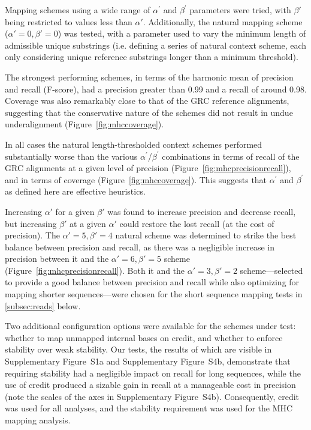 Mapping schemes using a wide range of $\alpha^\prime$ and $\beta^\prime$ parameters were tried, with $\beta'$ being restricted to values less than $\alpha'$. Additionally, the natural mapping scheme ($\alpha' = 0, \beta' = 0$) was tested, with a parameter used to vary the minimum length of admissible unique substrings (i.e. defining a series of natural context scheme, each only considering unique reference substrings longer than a minimum threshold). 

The strongest performing schemes, in terms of the harmonic mean of precision and recall (F-score), had a precision greater than 0.99 and a recall of around 0.98. Coverage was also remarkably close to that of the GRC reference alignments, suggesting that the conservative nature of the schemes did not result in undue underalignment (Figure~\ref{fig:mhccoverage}). 

In all cases the natural length-thresholded context schemes performed substantially worse than the various $\alpha^\prime$/$\beta^\prime$ combinations in terms of recall of the GRC alignments at a given level of precision (Figure~\ref{fig:mhcprecisionrecall}), and in terms of coverage (Figure~\ref{fig:mhccoverage}). This suggests that $\alpha^\prime$ and $\beta^\prime$ as defined here are effective heuristics. 

Increasing $\alpha'$ for a given $\beta'$ was found to increase precision and decrease recall, but increasing $\beta'$ at a given $\alpha'$ could restore the lost recall (at the cost of precision). The $\alpha' = 5, \beta' = 4$ natural scheme was determined to strike the best balance between precision and recall, as there was a negligible increase in precision between it and the $\alpha' = 6, \beta' = 5$ scheme (Figure~\ref{fig:mhcprecisionrecall}). Both it and the $\alpha' = 3, \beta' = 2$ scheme---selected to provide a good balance between precision and recall while also optimizing for mapping shorter sequences---were chosen for the short sequence mapping tests in \ref{subsec:reads} below.

Two additional configuration options were available for the schemes under test: whether to map unmapped internal bases on credit, and whether to enforce stability over weak stability. Our tests, the results of which are visible in Supplementary Figure~S1a and Supplementary Figure~S4b, demonstrate that requiring stability had a negligible impact on recall for long sequences, while the use of credit produced a sizable gain in recall at a manageable cost in precision (note the scales of the axes in Supplementary Figure~S4b). Consequently, credit was used for all analyses, and the stability requirement was used for the MHC mapping analysis.

